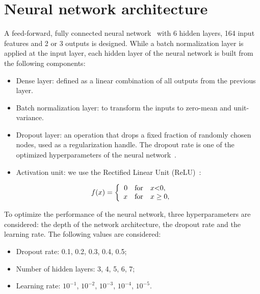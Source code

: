 \section{Neural network architecture}
\label{sec:dnn}

\par A feed-forward, fully connected neural network~\cite{hopfield1982neural} with 6 hidden layers, 164 input features and 2 or 3 outputs is designed. While a batch normalization layer is applied at the input layer, each hidden layer of the neural network is built from the following components:

\begin{itemize}
    \item Dense layer: defined as a linear combination of all outputs from the previous layer.
    \item Batch normalization layer: to transform the inputs to zero-mean and unit-variance. ~\cite{DBLP:journals/corr/IoffeS15}
    \item Dropout layer: an operation that drops a fixed fraction of randomly chosen nodes, used as a regularization handle. The dropout rate is one of the optimized hyperparameters of the neural network~\cite{JMLR:v15:srivastava14a}.
    \item Activation unit: we use the Rectified Linear Unit (ReLU)~\cite{Pich:1998xt}:	
\end{itemize}

\begin{equation}
    f(x) = \left \{ \begin{array}{rcl}0 & \mbox{for} & x $<$ 0,\\ x & \mbox{for} & x \ge 0,\end{array} \right. \label{eq:relu}
\end{equation}

\par To optimize the performance of the neural network, three hyperparameters are considered: the depth of the network architecture, the dropout rate and the learning rate. The following values are considered:

\begin{itemize}
    \item Dropout rate: 0.1, 0.2, 0.3, 0.4, 0.5;
    \item Number of hidden layers: 3, 4, 5, 6, 7;
    \item Learning rate: $10^{−1}$, $10^{−2}$, $10^{−3}$, $10^{−4}$, $10^{−5}$.
\end{itemize}

